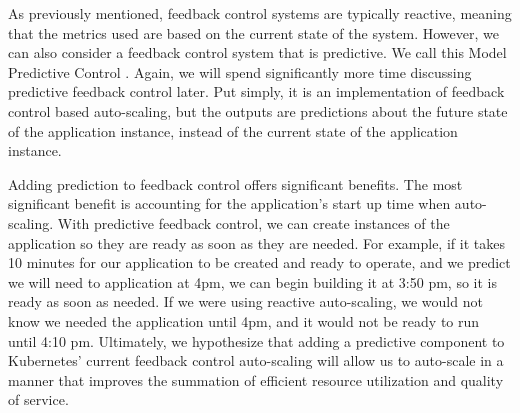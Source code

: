 As previously mentioned, feedback control systems are typically reactive,
meaning that the metrics used are based on the current state of the system.
However, we can also consider a feedback control system that is predictive. We
call this Model Predictive Control
\cite{auto-scaling-techniques-for-elastic-applications-in-cloud-environments}.
Again, we will spend significantly more time discussing predictive feedback
control later. Put simply, it is an implementation of feedback control
based auto-scaling, but the outputs are predictions about the future state of
the application instance, instead of the current state of the application instance.

Adding prediction to feedback control offers significant benefits. The most
significant benefit is accounting for the application's start up time when auto-scaling.
With predictive feedback control, we can create instances of the application
so they are ready as soon as they are needed. For example, if it takes 10
minutes for our application to be created and ready to operate, and we predict
we will need to application at 4pm, we can begin building it at 3:50 pm, so it
is ready as soon as needed. If we were using reactive auto-scaling, we
would not know we needed the application until 4pm, and it would not be ready to
run until 4:10 pm. Ultimately, we hypothesize that adding a predictive component to
Kubernetes' current feedback control auto-scaling will allow us to auto-scale in
a manner that improves the summation of efficient resource utilization and
quality of service.
